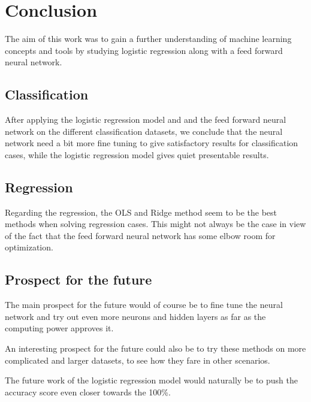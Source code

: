 \documentclass[../main.tex]{subfiles}
\begin{document}
\section{Conclusion}
The aim of this work was to gain a further understanding of machine learning concepts and tools by studying logistic regression along with a feed forward neural network. 
\subsection{Classification}
After applying the logistic regression model and and the feed forward neural network on the different classification datasets, we conclude that the neural network need a bit more fine tuning to give satisfactory results for classification cases, while the logistic regression model gives quiet presentable results.
\subsection{Regression}
Regarding the regression, the OLS and Ridge method seem to be the best methods when solving regression cases. This might not always be the case in view of the fact that the feed forward neural network has some elbow room for optimization.

\subsection{Prospect for the future}
The main prospect for the future would of course be to fine tune the neural network and try out even more neurons and hidden layers as far as the computing power approves it.

An interesting prospect for the future could also be to try these methods on more complicated and larger datasets, to see how they fare in other scenarios.

The future work of the logistic regression model would naturally be to push the accuracy score even closer towards the 100\%.
\end{document}
